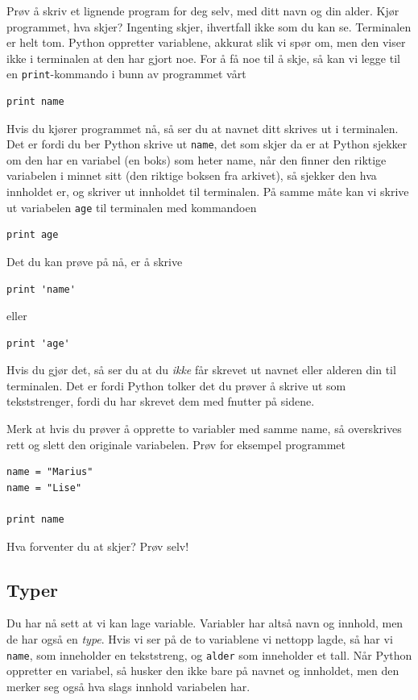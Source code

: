 \documentclass[a4paper, 11pt, notitlepage]{article}
\begin{document}
Prøv å skriv et lignende program for deg selv, med ditt navn og din alder. Kjør programmet, hva skjer? Ingenting skjer, ihvertfall ikke som du kan se. Terminalen er helt tom. Python oppretter variablene, akkurat slik vi spør om, men den viser ikke i terminalen at den har gjort noe. For å få noe til å skje, så kan vi legge til en \verb+print+-kommando i bunn av programmet vårt
\begin{lstlisting}
print name
\end{lstlisting}
Hvis du kjører programmet nå, så ser du at navnet ditt skrives ut i terminalen. Det er fordi du ber Python skrive ut \verb+name+, det som skjer da er at Python sjekker om den har en variabel (en boks) som heter name, når den finner den riktige variabelen i minnet sitt (den riktige boksen fra arkivet), så sjekker den hva innholdet er, og skriver ut innholdet til terminalen. På samme måte kan vi skrive ut variabelen \verb+age+ til terminalen med kommandoen
\begin{lstlisting}
print age
\end{lstlisting}
Det du kan prøve på nå, er å skrive 
\begin{lstlisting}
print 'name'
\end{lstlisting}
eller 
\begin{lstlisting}
print 'age'
\end{lstlisting}
Hvis du gjør det, så ser du at du \emph{ikke} får skrevet ut navnet eller alderen din til terminalen. Det er fordi Python tolker det du prøver å skrive ut som tekststrenger, fordi du har skrevet dem med fnutter på sidene.

Merk at hvis du prøver å opprette to variabler med samme name, så overskrives rett og slett den originale variabelen. Prøv for eksempel programmet
\begin{lstlisting}
name = "Marius"
name = "Lise"

print name
\end{lstlisting}
Hva forventer du at skjer? Prøv selv!

\subsection*{Typer}

Du har nå sett at vi kan lage variable. Variabler har altså navn og innhold, men de har også en \emph{type}. Hvis vi ser på de to variablene vi nettopp lagde, så har vi \verb+name+, som inneholder en tekststreng, og \verb+alder+ som inneholder et tall. Når Python oppretter en variabel, så husker den ikke bare på navnet og innholdet, men den merker seg også hva slags innhold variabelen har.
\end{document}
